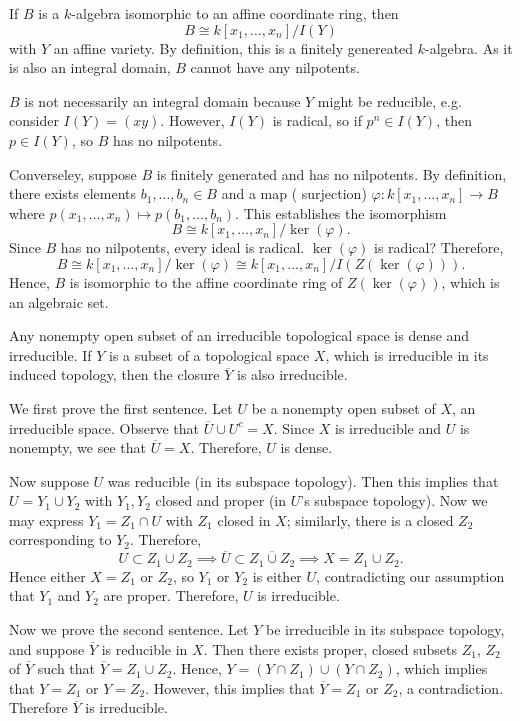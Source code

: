 \documentclass{/Users/SHER/Documents/Hartshorne-Exercises/hw_pset} %
\newcommand{\x}{x_1, \dots, x_n}    %
\renewcommand{\phi}{\varphi}
\newcommand{\lfy}[1]{{\color{Maroon} #1}}
\begin{document}
\begin{solution}
    If $B$ is a $k$-algebra isomorphic to an affine coordinate ring, then 
    \[
        B \cong k[\x]/I(Y)
    \]
    with $Y$ an affine variety. By definition, this is a finitely genereated $k$-algebra. As it is also an integral domain, $B$ cannot have any nilpotents. 

    \lfy{$B$ is not necessarily an integral domain because $Y$ might be reducible, e.g. consider $I(Y) = (xy)$. However, $I(Y)$ is radical, so if $p^n \in I(Y)$, then $p \in I(Y)$, so $B$ has no nilpotents.}

    Converseley, suppose $B$ is finitely generated and has no nilpotents. By definition, 
    there exists elements $b_1, \dots, b_n \in B$ and a map (\lfy{surjection}) $\phi: k[\x] \to B$ 
    where $p(\x) \mapsto p(b_1, \dots, b_n)$. This establishes the isomorphism 
    \[
        B \cong k[\x]/\ker(\phi).
    \]
    Since $B$ has no nilpotents, every ideal is radical. \lfy{$\ker(\phi)$ is radical?} Therefore, 
    \[
        B \cong k[\x]/\ker(\phi) \cong k[\x]/I(Z(\ker(\phi))).
    \]
    Hence, $B$ is isomorphic to the affine coordinate ring of $Z(\ker(\phi))$, 
    which is an algebraic set.
\end{solution}

\begin{exercise}[1.6]
    Any nonempty open subset of an irreducible topological space is dense and
    irreducible.
    If $Y$ is a subset of a topological space $X$, which is irreducible in its
    induced topology, then the closure $\overline{Y}$ is also irreducible.
\end{exercise}

\begin{solution}
    We first prove the first sentence.
    Let $U$ be a nonempty open subset of $X$, an irreducible space. 
    Observe that $\overline{U} \cup U^c = X$. Since $X$ is irreducible and $U$ 
    is nonempty, we see that $\overline{U} = X$. Therefore, $U$ is dense.

    Now suppose $U$ was reducible (in its subspace topology). Then this implies that 
    $U = Y_1 \cup Y_2$ with $Y_1, Y_2$ closed and proper (in $U$'s subspace topology). 
    Now we may express $Y_1 = Z_1 \cap U$ with $Z_1$ closed in $X$; similarly, there is a closed $Z_2$ corresponding 
    to $Y_2$. Therefore, 
    \[
        U \subset Z_1 \cup Z_2 \implies \overline{U} \subset \overline{Z_1 \cup Z_2} \implies 
        X = Z_1 \cup Z_2.        
    \]
    Hence either $X = Z_1$ or $Z_2$, so $Y_1$ or $Y_2$ is either $U$, contradicting our 
    assumption that $Y_1$ and $Y_2$ are proper. Therefore, $U$ is irreducible. 

    Now we prove the second sentence. Let $Y$ be irreducible in its subspace topology, and 
    suppose $\overline{Y}$ is reducible in $X$. Then there exists proper, closed subsets 
    $Z_1$, $Z_2$ of $\overline{Y}$ such that $\overline{Y} = Z_1 \cup Z_2$. Hence, 
    $Y = (Y \cap Z_1) \cup (Y \cap Z_2)$, which implies that $Y = Z_1$ 
    or $Y = Z_2$. However, this implies that $\overline{Y} = Z_1$ or $Z_2$, a contradiction. 
    Therefore $\overline{Y}$ is irreducible. 

\end{solution}
\end{document}
